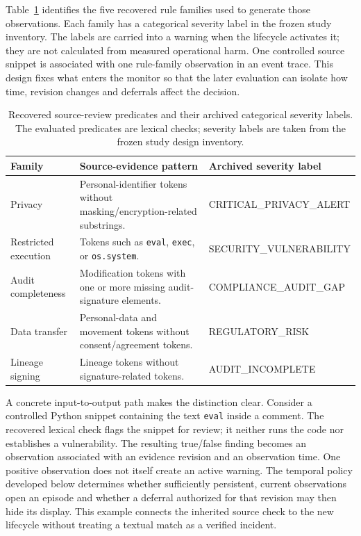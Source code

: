\documentclass[preprint,11pt]{elsarticle}
\newcommand{\code}[1]{\texttt{#1}}
\begin{document}
Table~\ref{tab:recovery} identifies the five recovered rule families used to generate those observations. Each family has a categorical severity label in the frozen study inventory. The labels are carried into a warning when the lifecycle activates it; they are not calculated from measured operational harm. One controlled source snippet is associated with one rule-family observation in an event trace. This design fixes what enters the monitor so that the later evaluation can isolate how time, revision changes and deferrals affect the decision.


\begin{table}[ht]
\centering\small
\caption{Recovered source-review predicates and their archived categorical severity labels. The evaluated predicates are lexical checks; severity labels are taken from the frozen study design inventory.}\label{tab:recovery}
\begin{tabularx}{\linewidth}{@{}>{\raggedright\arraybackslash}p{.18\linewidth}X>{\raggedright\arraybackslash\ttfamily\scriptsize}p{.32\linewidth}@{}}\toprule
Family & Source-evidence pattern & Archived severity label \\\midrule
Privacy & Personal-identifier tokens without masking/encryption-related substrings. & CRITICAL\_PRIVACY\_ALERT\\
Restricted execution & Tokens such as \code{eval}, \code{exec}, or \code{os.system}. & SECURITY\_VULNERABILITY\\
Audit completeness & Modification tokens with one or more missing audit-signature elements. & COMPLIANCE\_AUDIT\_GAP\\
Data transfer & Personal-data and movement tokens without consent/agreement tokens. & REGULATORY\_RISK\\
Lineage signing & Lineage tokens without signature-related tokens. & AUDIT\_INCOMPLETE\\\bottomrule
\end{tabularx}
\end{table}

A concrete input-to-output path makes the distinction clear. Consider a controlled Python snippet containing the text \code{eval} inside a comment. The recovered lexical check flags the snippet for review; it neither runs the code nor establishes a vulnerability. The resulting true/false finding becomes an observation associated with an evidence revision and an observation time. One positive observation does not itself create an active warning. The temporal policy developed below determines whether sufficiently persistent, current observations open an episode and whether a deferral authorized for that revision may then hide its display. This example connects the inherited source check to the new lifecycle without treating a textual match as a verified incident.
\end{document}
